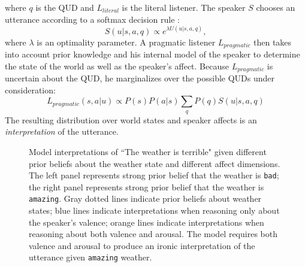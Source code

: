 \documentclass[10pt,letterpaper]{article}
\begin{document}
where $q$ is the QUD and $L_{literal}$ is the literal listener. 
The speaker $S$ chooses an utterance according to a softmax decision rule \cite{sutton1998reinforcement}:
\begin{equation}
S(u | s, a, q) \propto e^{\lambda U(u | s, a, q)},
\end{equation}
where $\lambda$ is an optimality parameter.
%
A pragmatic listener $L_{pragmatic}$ then takes into account prior knowledge and his internal model of the speaker to determine the state of the world as well as the speaker's affect. Because $L_{pragmatic}$ is uncertain about the QUD, he marginalizes over the possible QUDs under consideration:
$$
L_{pragmatic}(s, a | u) \propto P(s) P(a | s) \sum_{q}{P (q) S (u|s, a, q)}
$$
%
The resulting distribution over world states and speaker affects is an \emph{interpretation} of the utterance. 

\begin{figure}
\caption{Model interpretations of ``The weather is terrible" given different prior beliefs about the weather state and different affect dimensions. The left panel represents strong prior belief that the weather is \texttt{bad}; the right panel represents strong prior belief that the weather is \texttt{amazing}. Gray dotted lines indicate prior beliefs about weather states; blue lines indicate interpretations when reasoning only about the speaker's valence; orange lines indicate interpretations when reasoning about both valence and arousal. The model requires both valence and arousal to produce an ironic interpretation of the utterance given \texttt{amazing} weather.}
\label{sim12}
\end{figure}
\end{document}
